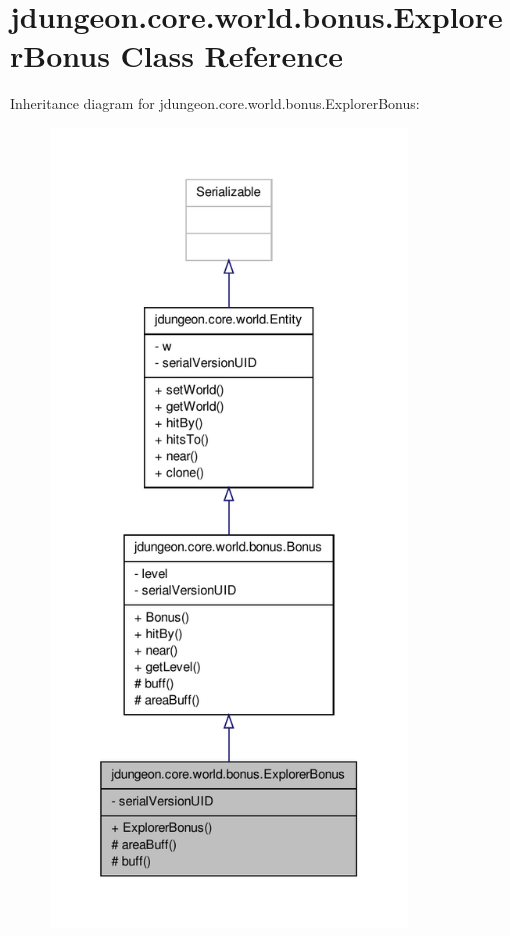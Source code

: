 \hypertarget{classjdungeon_1_1core_1_1world_1_1bonus_1_1_explorer_bonus}{
\section{jdungeon.core.world.bonus.ExplorerBonus Class Reference}
\label{classjdungeon_1_1core_1_1world_1_1bonus_1_1_explorer_bonus}
}


Inheritance diagram for jdungeon.core.world.bonus.ExplorerBonus:
\nopagebreak
\begin{figure}[H]
\begin{center}
\leavevmode
\includegraphics[height=600pt]{classjdungeon_1_1core_1_1world_1_1bonus_1_1_explorer_bonus__inherit__graph}
\end{center}
\end{figure}


